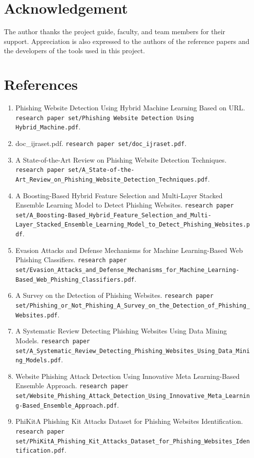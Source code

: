 \documentclass[conference]{IEEEtran}
\begin{document}
\section{Acknowledgement}
The author thanks the project guide, faculty, and team members for their support. Appreciation is also expressed to the authors of the reference papers and the developers of the tools used in this project.

\section*{References}
\begin{enumerate}
    \item Phishing Website Detection Using Hybrid Machine Learning Based on URL. \texttt{research paper set/Phishing Website Detection Using Hybrid_Machine.pdf}.
    \item doc\_ijraset.pdf. \texttt{research paper set/doc_ijraset.pdf}.
    \item A State-of-the-Art Review on Phishing Website Detection Techniques. \texttt{research paper set/A_State-of-the-Art_Review_on_Phishing_Website_Detection_Techniques.pdf}.
    \item A Boosting-Based Hybrid Feature Selection and Multi-Layer Stacked Ensemble Learning Model to Detect Phishing Websites. \texttt{research paper set/A_Boosting-Based_Hybrid_Feature_Selection_and_Multi-Layer_Stacked_Ensemble_Learning_Model_to_Detect_Phishing_Websites.pdf}.
    \item Evasion Attacks and Defense Mechanisms for Machine Learning-Based Web Phishing Classifiers. \texttt{research paper set/Evasion_Attacks_and_Defense_Mechanisms_for_Machine_Learning-Based_Web_Phishing_Classifiers.pdf}.
    \item A Survey on the Detection of Phishing Websites. \texttt{research paper set/Phishing_or_Not_Phishing_A_Survey_on_the_Detection_of_Phishing_Websites.pdf}.
    \item A Systematic Review Detecting Phishing Websites Using Data Mining Models. \texttt{research paper set/A_Systematic_Review_Detecting_Phishing_Websites_Using_Data_Mining_Models.pdf}.
    \item Website Phishing Attack Detection Using Innovative Meta Learning-Based Ensemble Approach. \texttt{research paper set/Website_Phishing_Attack_Detection_Using_Innovative_Meta_Learning-Based_Ensemble_Approach.pdf}.
    \item PhiKitA Phishing Kit Attacks Dataset for Phishing Websites Identification. \texttt{research paper set/PhiKitA_Phishing_Kit_Attacks_Dataset_for_Phishing_Websites_Identification.pdf}.

\end{enumerate}
\end{document}
